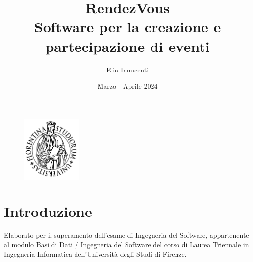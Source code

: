 \documentclass[11pt]{article}
\title{RendezVous \\
\vspace{0.5em}
\large Software per la creazione e partecipazione di eventi} %
\author{Elia Innocenti}
\date{Marzo - Aprile 2024}
\begin{document}

    \maketitle

    \vspace{1em}

    \begin{figure}[h]
        \begin{minipage}{\textwidth}
            \centering
            \includegraphics[width=3cm]{unifi-logo}
        \end{minipage}
        \label{fig:uni-logo}
    \end{figure}



    \newpage

    \tableofcontents


    \newpage

    \section{Introduzione} \label{sec:introduzione}

        Elaborato per il superamento dell'esame di Ingegneria del Software, appartenente al modulo Basi di Dati / Ingegneria del Software del corso di Laurea Triennale in Ingegneria Informatica dell'Università degli Studi di Firenze.
\end{document}
